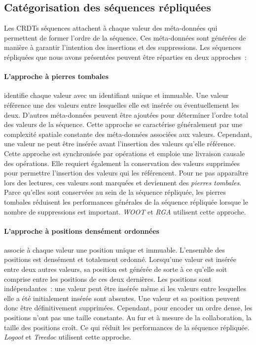 

\clearpage %

\subsection{Catégorisation des séquences répliquées}

Les \acp{CRDT} séquences attachent à chaque valeur des méta-données qui permettent de former l'ordre de la séquence.
Ces méta-données sont générées de manière à garantir l'intention des insertions et des suppressions.
Les séquences répliquées que nous avons présentées peuvent être réparties en deux approches~:

\paragraph{L'approche à pierres tombales}\autocite{oster_2006_woot, roh_2011_rga} identifie chaque valeur avec un identifiant unique et immuable.
Une valeur référence une des valeurs entre lesquelles elle est insérée ou éventuellement les deux.
D'autres méta-données peuvent être ajoutées pour déterminer l'ordre total des valeurs de la séquence.
Cette approche se caractérise généralement par une complexité spatiale constante des méta-données associées aux valeurs.
Cependant, une valeur ne peut être insérée avant l'insertion des valeurs qu'elle référence.
Cette approche est synchronisée par opérations et emploie une livraison causale des opérations.
Elle requiert également la conservation des valeurs supprimées pour permettre l'insertion des valeurs qui les référencent.
Pour ne pas apparaître lors des lectures, ces valeurs sont marquées et deviennent des \emph{pierres tombales}.
Parce qu'elles sont conservées au sein de la séquence répliquée, les pierres tombales réduisent les performances générales de la séquence répliquée lorsque le nombre de suppressions est important.
\emph{WOOT} et \emph{RGA} utilisent cette approche.

\paragraph{L'approche à positions densément ordonnées}\autocite{weiss_2009_logoot, preguica_2009_treedoc, nedelec_2013_lseq} associe à chaque valeur une position unique et immuable.
L'ensemble des positions est densément et totalement ordonné.
Lorsqu'une valeur est insérée entre deux autres valeurs, sa position est générée de sorte à ce qu'elle soit comprise entre les positions de ces deux dernières.
Les positions sont indépendantes~: une valeur peut être insérée même si les valeurs entre lesquelles elle a été initialement insérée sont absentes.
Une valeur et sa position peuvent donc être définitivement supprimées.
Cependant, pour encoder un ordre dense, les positions n'ont pas une taille constante.
Au fur et à mesure de la collaboration, la taille des positions croît.
Ce qui réduit les performances de la séquence répliquée.
\emph{Logoot} et \emph{Treedoc} utilisent cette approche.

